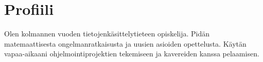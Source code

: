\section*{Profiili}

Olen kolmannen vuoden tietojenkäsittelytieteen opiskelija. Pidän
matemaattisesta ongelmanratkaisusta ja uusien asioiden opettelusta. Käytän
vapaa-aikaani ohjelmointiprojektien tekemiseen ja kavereiden kanssa pelaamisen.
